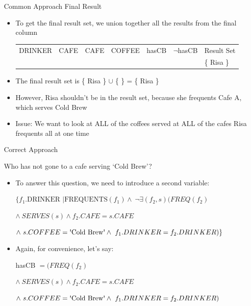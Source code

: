 \documentclass[aspectratio=169]{beamer}
\begin{document}
\begin{frame}{Common Approach Final Result}
\begin{itemize}
\item To get the final result set, we union together all the results from the final column

\hspace{-1em}
\begin{tabular}{|l|l|l|p{2cm}||l|l||l|}  \hline \hline
\color{white}\textrm{DRINKER} & \color{white}\textrm{CAFE} & \color{white} \textrm{CAFE} &  \color{white}\textrm{COFFEE} &\color{white}\textrm{hasCB} & \color{white} $\neg$\textrm{hasCB} &\color{white} \textrm{Result Set}\\ 

& & & & & & \{ Risa \} \\ \hline
 \end{tabular}

\item The final result set is \{ Risa \} $\cup$ \{ \}  = \{ Risa \}
\item However, Risa shouldn't be in the result set, because she frequents Cafe A, which serves Cold Brew 
\item Issue: We want to look at ALL of the coffees served at ALL of the cafes Risa frequents all at one time
\end{itemize}


\end{frame}



\begin{frame}{Correct Approach}

Who has not gone to a cafe serving `Cold Brew'?\\
\begin{itemize}
\item To answer this question, we need to introduce a second variable:

$\{f_1.\textrm{DRINKER } | \textrm{FREQUENTS}(f_1) \wedge\ \neg \exists(f_2,s)(FREQ(f_2) $

\hspace{2em} $\wedge\ SERVES(s) \wedge f_2.CAFE = s.CAFE $

\hspace{2em} $\wedge\ s.COFFEE =  \textrm{\textquotesingle{Cold Brew}\textquotesingle} \wedge\ f_1.DRINKER = f_2.DRINKER) \}$


\item Again, for convenience, let's say:
 
hasCB $ =(FREQ(f_2) $

\hspace{2em} $\wedge\ SERVES(s) \wedge f_2.CAFE = s.CAFE $

\hspace{2em} $\wedge\ s.COFFEE =  \textrm{\textquotesingle{Cold Brew}\textquotesingle} \wedge\ f_1.DRINKER = f_2.DRINKER) $
\end{itemize}


\end{frame}
\end{document}
